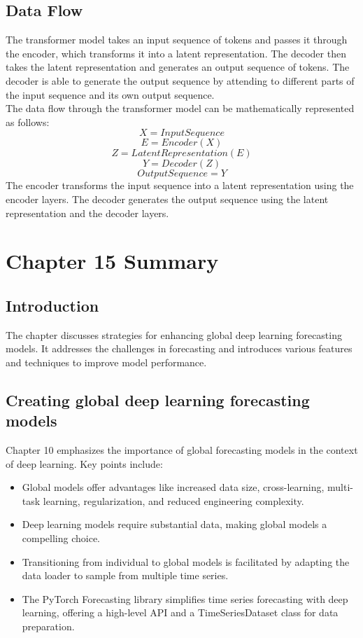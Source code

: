 \documentclass{article}
\begin{document}
\subsection{Data Flow}
The transformer model takes an input sequence of tokens and passes it through the encoder, which transforms it into a latent representation. The decoder then takes the latent representation and generates an output sequence of tokens. The decoder is able to generate the output sequence by attending to different parts of the input sequence and its own output sequence. \\

The data flow through the transformer model can be mathematically represented as follows: \\ 
\[ X = InputSequence \]
\[E = Encoder(X) \]
\[Z = LatentRepresentation(E) \]
\[Y = Decoder(Z) \]
\[OutputSequence = Y \]
The encoder transforms the input sequence into a latent representation using the encoder layers. The decoder generates the output sequence using the latent representation and the decoder layers.

\section{Chapter 15 Summary}

\subsection{Introduction}
The chapter discusses strategies for enhancing global deep learning forecasting models. It addresses the challenges in forecasting and introduces various features and techniques to improve model performance.

\subsection{Creating global deep learning forecasting models}
Chapter 10 emphasizes the importance of global forecasting models in the context of deep learning. Key points include:
\begin{itemize}
    \item Global models offer advantages like increased data size, cross-learning, multi-task learning, regularization, and reduced engineering complexity.
    \item Deep learning models require substantial data, making global models a compelling choice.
    \item Transitioning from individual to global models is facilitated by adapting the data loader to sample from multiple time series.
    \item The PyTorch Forecasting library simplifies time series forecasting with deep learning, offering a high-level API and a TimeSeriesDataset class for data preparation.
\end{itemize}
\end{document}
